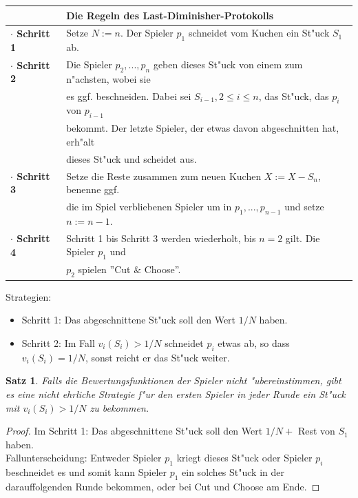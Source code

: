 \documentclass[11pt, a4paper, twoside]{article}
\newtheorem*{satz}{Satz}
\numberwithin{equation}{section}
\begin{document}
\begin{tabular*}{\textwidth}[]{|ll|}
\hline
&\textbf{Die Regeln des Last-Diminisher-Protokolls}\\
\hline
\textbf{$\cdot$ Schritt 1}& Setze $N:=n$. Der Spieler $p_1$ schneidet vom Kuchen ein St"uck $S_1$ ab.\\
\textbf{$\cdot$ Schritt 2}& Die Spieler $p_2,...,p_n$ geben dieses St"uck von einem zum n"achsten, wobei sie\\&es ggf. beschneiden. Dabei sei $S_{i-1}, 2 \leq i \leq n$, das St"uck, das $p_i$ von $p_{i-1}$\\&bekommt. Der letzte Spieler, der etwas davon abgeschnitten hat, erh"alt\\&dieses St"uck und scheidet aus.\\
\textbf{$\cdot$ Schritt 3}& Setze die Reste zusammen zum neuen Kuchen $X:=X-S_n$, benenne ggf.\\&die im Spiel verbliebenen Spieler um in $p_1,...,p_{n-1}$ und setze $n:=n-1$. \\
\textbf{$\cdot$ Schritt 4}& Schritt 1 bis Schritt 3 werden wiederholt, bis $n=2$ gilt. Die Spieler $p_1$ und\\&$p_2$ spielen ''Cut $\&$ Choose''.\\
\hline
\end{tabular*}
\newline
\newline
Strategien:\\
\begin{itemize}
\item Schritt 1: Das abgeschnittene St"uck soll den Wert $1/N$ haben.
\item Schritt 2: Im Fall $v_i(S_i)>1/N$ schneidet $p_i$ etwas ab, so dass $v_i(S_i)=1/N$, sonst reicht er das St"uck weiter.
\end{itemize}
\begin{satz}
Falls die Bewertungsfunktionen der Spieler nicht "ubereinstimmen, gibt es eine nicht ehrliche Strategie f"ur den ersten Spieler in jeder Runde ein St"uck mit $v_i(S_i)>1/N$ zu bekommen.
\end{satz}
\begin{proof}
Im Schritt 1: Das abgeschnittene St"uck soll den Wert $1/N+$ Rest von $S_1$ haben.\\
Fallunterscheidung: Entweder Spieler $p_1$ kriegt dieses St"uck oder Spieler $p_i$ beschneidet es und somit kann Spieler $p_1$ ein solches St"uck in der darauffolgenden Runde bekommen, oder bei Cut und Choose am Ende.
\end{proof}
\end{document}
